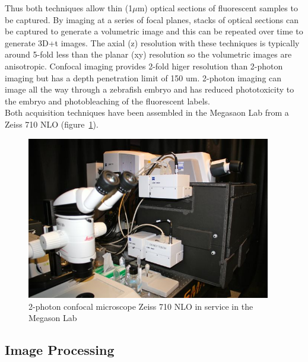 Thus both techniques allow thin (1$\mu$m) optical sections of fluorescent
samples to be captured. By imaging at a series of focal planes, stacks of
optical sections can be captured to generate a volumetric image and this can be
repeated over time to generate 3D+t images. The axial (z) resolution with these
techniques is typically around 5-fold less than the planar (xy) resolution so
the volumetric images are anisotropic. Confocal imaging provides 2-fold higer
resolution than 2-photon imaging but has a depth penetration limit of  150 um.
2-photon imaging can image all the way through a zebrafish embryo and has
reduced phototoxicity to the embryo and photobleaching of the fluorescent
labels.\\

Both acquisition techniques have been assembled in the Megasaon Lab from a
Zeiss 710 NLO (figure~\ref{fig:MicMegason}).

\begin{figure}[htb]
\begin{center}
\leavevmode
 \includegraphics[width=0.95\textwidth]{pictures/PICmicroscope}
\end{center}
\caption{2-photon confocal microscope Zeiss 710 NLO in service in the Megason
Lab}
\label{fig:MicMegason}
\end{figure}




\subsection{Image Processing}

